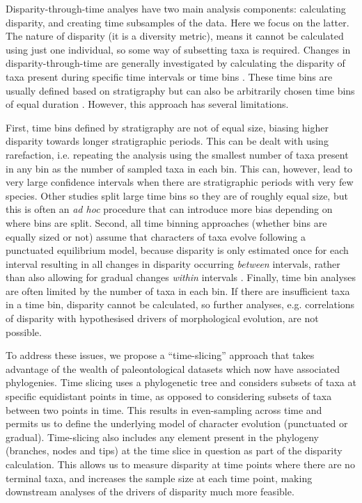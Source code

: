 \documentclass[12pt,a4paper]{article}
\begin{document}
Disparity-through-time analyes have two main analysis components: calculating disparity, and creating time subsamples of the data. 
Here we focus on the latter.
The nature of disparity (it is a diversity metric), means it cannot be calculated using just one individual, so some way of subsetting taxa is required.
Changes in disparity-through-time are generally investigated by calculating the disparity of taxa present during specific time intervals or time bins \citep[e.g][]{cisneros2010,prentice2011,Hughes20082013,hopkinsdecoupling2013,bentonmodels2014,bensonfaunal2014}.
These time bins are usually defined based on stratigraphy \citep[e.g.][]{cisneros2010,prentice2011,Hughes20082013,bentonmodels2014} but can also be arbitrarily chosen time bins of equal duration \citep{Butler2012,hopkinsdecoupling2013,bensonfaunal2014}.
However, this approach has several limitations.

First, time bins defined by stratigraphy are not of equal size, biasing higher disparity towards longer stratigraphic periods. 
This can be dealt with using rarefaction, i.e. repeating the analysis using the smallest number of taxa present in any bin as the number of sampled taxa in each bin. 
This can, however, lead to very large confidence intervals when there are stratigraphic periods with very few species.
Other studies split large time bins so they are of roughly equal size, but this is often an \textit{ad hoc} procedure that can introduce more bias depending on where bins are split.
Second, all time binning approaches (whether bins are equally sized or not) assume that characters of taxa evolve following a punctuated equilibrium model, because disparity is only estimated once for each interval resulting in all changes in disparity occurring \textit{between} intervals, rather than also allowing for gradual changes \textit{within} intervals \citep{Hunt21042015}.
Finally, time bin analyses are often limited by the number of taxa in each bin.
If there are insufficient taxa in a time bin, disparity cannot be calculated, so further analyses, e.g. correlations of disparity with hypothesised drivers of morphological evolution, are not possible.

To address these issues, we propose a ``time-slicing'' approach that takes advantage of the wealth of paleontological datasets which now have associated phylogenies. 
Time slicing uses a phylogenetic tree and considers subsets of taxa at specific equidistant points in time, as opposed to considering subsets of taxa between two points in time.
This results in even-sampling across time and permits us to define the underlying model of character evolution (punctuated or gradual).  
Time-slicing also includes any element present in the phylogeny (branches, nodes and tips) at the time slice in question as part of the disparity calculation.
This allows us to measure disparity at time points where there are no terminal taxa, and increases the sample size at each time point, making downstream analyses of the drivers of disparity much more feasible.
\end{document}
